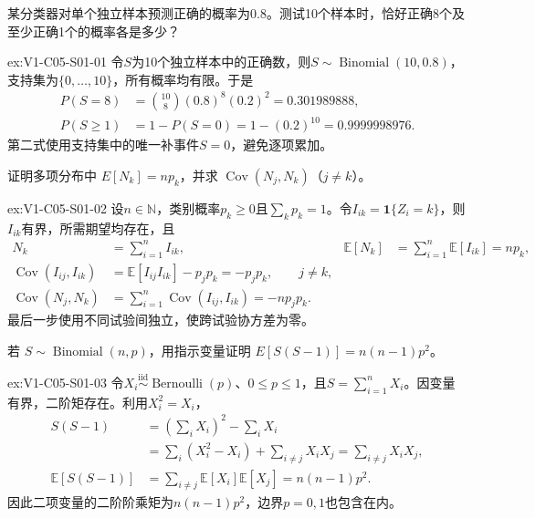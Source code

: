 \begin{SLChapterExercisePairSection}

\begin{exercise}\label{ex:V1-C05-S01-01}
某分类器对单个独立样本预测正确的概率为0.8。测试10个样本时，恰好正确8个及至少正确1个的概率各是多少？
\end{exercise}
\label{sol:V1-C05-S01-01}
\begin{chapterexercisesolution}{ex:V1-C05-S01-01}
令$S$为10个独立样本中的正确数，则$S\sim\operatorname{Binomial}(10,0.8)$，支持集为$\{0,\ldots,10\}$，所有概率均有限。于是
\[
\begin{aligned}
P(S=8)
&=\binom{10}{8}(0.8)^8(0.2)^2
=0.301989888,\\
P(S\ge1)
&=1-P(S=0)
=1-(0.2)^{10}
=0.9999998976.
\end{aligned}
\]
第二式使用支持集中的唯一补事件$S=0$，避免逐项累加。
\end{chapterexercisesolution}

\begin{exercise}\label{ex:V1-C05-S01-02}
证明多项分布中 $E[N_k]=np_k$，并求 $\operatorname{Cov}(N_j,N_k)$（$j\ne k$）。
\end{exercise}
\label{sol:V1-C05-S01-02}
\begin{chapterexercisesolution}{ex:V1-C05-S01-02}
设$n\in\mathbb N$，类别概率$p_k\ge0$且$\sum_kp_k=1$。令$I_{ik}=\mathbf1\{Z_i=k\}$，则$I_{ik}$有界，所需期望均存在，且
\[
\begin{aligned}
N_k&=\sum_{i=1}^n I_{ik},
&\mathbb E[N_k]&=\sum_{i=1}^n\mathbb E[I_{ik}]=np_k,\\
\operatorname{Cov}(I_{ij},I_{ik})
&=\mathbb E[I_{ij}I_{ik}]-p_jp_k
=-p_jp_k,\qquad j\ne k,\\
\operatorname{Cov}(N_j,N_k)
&=\sum_{i=1}^n\operatorname{Cov}(I_{ij},I_{ik})
=-np_jp_k.
\end{aligned}
\]
最后一步使用不同试验间独立，使跨试验协方差为零。
\end{chapterexercisesolution}

\begin{exercise}\label{ex:V1-C05-S01-03}
若 $S\sim\operatorname{Binomial}(n,p)$，用指示变量证明 $E[S(S-1)]=n(n-1)p^2$。
\end{exercise}
\label{sol:V1-C05-S01-03}
\begin{chapterexercisesolution}{ex:V1-C05-S01-03}
令$X_i\overset{\mathrm{iid}}{\sim}\operatorname{Bernoulli}(p)$、$0\le p\le1$，且$S=\sum_{i=1}^nX_i$。因变量有界，二阶矩存在。利用$X_i^2=X_i$，
\[
\begin{aligned}
S(S-1)
&=\left(\sum_iX_i\right)^2-\sum_iX_i\\
&=\sum_i(X_i^2-X_i)+\sum_{i\ne j}X_iX_j
=\sum_{i\ne j}X_iX_j,\\
\mathbb E[S(S-1)]
&=\sum_{i\ne j}\mathbb E[X_i]\mathbb E[X_j]
=n(n-1)p^2.
\end{aligned}
\]
因此二项变量的二阶阶乘矩为$n(n-1)p^2$，边界$p=0,1$也包含在内。
\end{chapterexercisesolution}


\end{SLChapterExercisePairSection}
